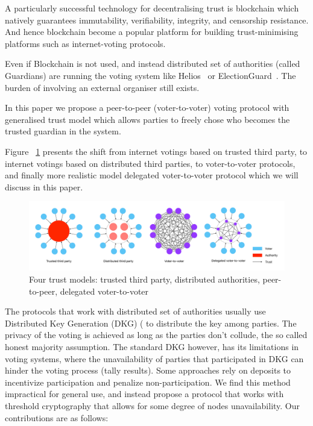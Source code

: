 \documentclass[runningheads]{llncs}
\begin{document}
A particularly successful technology for decentralising trust is blockchain which natively guarantees immutability, verifiability, integrity, and censorship resistance. And hence blockchain become a popular platform for building trust-minimising platforms such as internet-voting protocols.

Even if Blockchain is not used, and instead distributed set of authorities (called Guardians) are running the voting system like Helios~\cite{adidaHeliosWebbasedOpenAudit2008} or ElectionGuard~\cite{ElectionGuard}. The burden of involving an external organiser still exists.

In this paper we propose a peer-to-peer (voter-to-voter) voting protocol with generalised trust model which allows parties to freely chose who becomes the trusted guardian in the system. 

Figure ~\ref{fig:trust-models} presents the shift from internet votings based on trusted third party, to internet votings based on distributed third parties, to voter-to-voter protocols, and finally more realistic model delegated voter-to-voter protocol which we will discuss in this paper.

\begin{figure}
    \centering
    \includegraphics[width=\textwidth]{trust-models-voting.pdf}
    \caption{Four trust models: trusted third party, distributed authorities, peer-to-peer, delegated voter-to-voter}
    \label{fig:trust-models}
\end{figure}

The protocols that work with distributed set of authorities usually use Distributed Key Generation (DKG) (%
to distribute the key among parties. The privacy of the voting is achieved as long as the parties don't collude, the so called honest majority assumption. The standard DKG however, has its limitations in voting systems, where the unavailability of parties that participated in DKG can hinder the voting process (tally results). %
Some approaches rely on deposits %
to incentivize participation and penalize non-participation. We find this method impractical for general use, and instead propose a protocol that works with threshold cryptography that allows for some degree of nodes unavailability. Our contributions are as follows:
\end{document}
